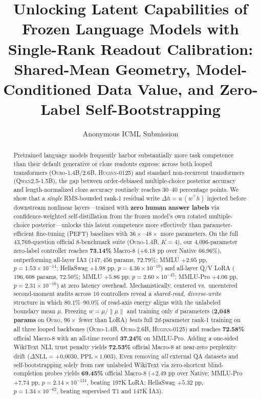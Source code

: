 \documentclass[10pt,twocolumn]{article}
\title{\textbf{Unlocking Latent Capabilities of Frozen Language Models with Single-Rank Readout Calibration: Shared-Mean Geometry, Model-Conditioned Data Value, and Zero-Label Self-Bootstrapping}}
\author{Anonymous ICML Submission}
\date{}
\begin{document}
\maketitle

\begin{abstract}
Pretrained language models frequently harbor substantially more task competence than their default generative or cloze readouts express: across both looped transformers (\textsc{Ouro-1.4B/2.6B}, \textsc{Huginn-0125}) and standard non-recurrent transformers (\textsc{Qwen2.5-1.5B}), the gap between order-debiased multiple-choice posterior accuracy and length-normalized cloze accuracy routinely reaches $30$--$40$ percentage points.
We show that a \emph{single} RMS-bounded rank-1 residual write $\Delta h = u\,(w^\top h)$ injected before downstream nonlinear layers---trained with \textbf{zero human answer labels} via confidence-weighted self-distillation from the frozen model's own rotated multiple-choice posterior---unlocks this latent competence more effectively than parameter-efficient fine-tuning (PEFT) baselines with $36\times$--$48\times$ more parameters.
On the full 43,769-question official 8-benchmark suite (\textsc{Ouro-1.4B}, $K=4$), our 4,096-parameter zero-label controller reaches \textbf{73.14\%} Macro-8 ($+6.18$ pp over Native $66.96\%$), outperforming all-layer IA3 ($147{,}456$ params, $72.79\%$; MMLU $+2.95$ pp, $p=1.53\times 10^{-14}$; HellaSwag $+1.98$ pp, $p=4.36\times 10^{-10}$) and all-layer Q/V LoRA ($196{,}608$ params, $72.50\%$; MMLU $+5.86$ pp, $p=2.60\times 10^{-45}$; MMLU-Pro $+4.06$ pp, $p=2.31\times 10^{-16}$) at zero latency overhead.
Mechanistically, centered vs.\ uncentered second-moment audits across 16 controllers reveal a \emph{shared-read, diverse-write} structure in which $80.1\%$--$90.0\%$ of read-axis energy aligns with the unlabeled boundary mean $\mu$. Freezing $w=\mu/\|\mu\|$ and training only $d$ parameters (\textbf{2,048 params} on \textsc{Ouro}, $96\times$ fewer than LoRA) \emph{beats} full $2d$-parameter rank-1 training on all three looped backbones (\textsc{Ouro-1.4B}, \textsc{Ouro-2.6B}, \textsc{Huginn-0125}) and reaches \textbf{72.58\%} official Macro-8 with an all-time record \textbf{37.24\%} on MMLU-Pro.
Adding a one-sided WikiText NLL trust penalty yields \textbf{72.53\%} official Macro-8 at near-zero perplexity drift ($\Delta\mathrm{NLL}=+0.0030$, $\mathrm{PPL}\times 1.003$).
Even removing \emph{all} external QA datasets and self-bootstrapping solely from raw unlabeled WikiText via zero-shortcut blind-completion probes yields \textbf{69.45\%} official Macro-8 ($+2.49$ pp over Native; MMLU-Pro $+7.74$ pp, $p=2.14\times 10^{-124}$, beating 197K LoRA; HellaSwag $+5.32$ pp, $p=1.34\times 10^{-62}$, beating supervised T1 and 147K IA3).

\end{abstract}
\end{document}
